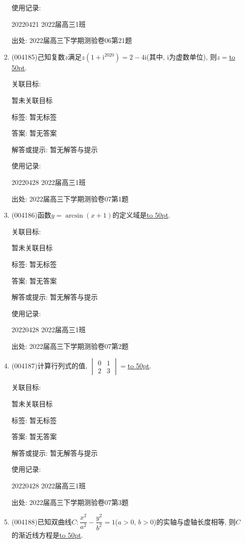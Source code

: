 \documentclass[10pt,a4paper]{article}
\newcommand{\blank}[1]{\underline{\hbox to #1pt{}}}
\begin{document}
\begin{enumerate}[1.]
使用记录:

20220421	2022届高三1班			


出处: 2022届高三下学期测验卷06第21题
\item { (004185)}己知复数$z$满足$z(1+\mathrm{i}^{2020})=2-4\mathrm{i}$(其中, $\mathrm{i}$为虚数单位), 则$z=$\blank{50}.


关联目标:

暂未关联目标



标签: 暂无标签

答案: 暂无答案

解答或提示: 暂无解答与提示

使用记录:

20220428	2022届高三1班	


出处: 2022届高三下学期测验卷07第1题
\item { (004186)}函数$y=\arcsin (x+1)$的定义域是\blank{50}.


关联目标:

暂未关联目标



标签: 暂无标签

答案: 暂无答案

解答或提示: 暂无解答与提示

使用记录:

20220428	2022届高三1班	


出处: 2022届高三下学期测验卷07第2题
\item { (004187)}计算行列式的值, $\begin{vmatrix}0 & 1  \\2 & 3  \end{vmatrix}=$\blank{50}.


关联目标:

暂未关联目标



标签: 暂无标签

答案: 暂无答案

解答或提示: 暂无解答与提示

使用记录:

20220428	2022届高三1班	


出处: 2022届高三下学期测验卷07第3题
\item { (004188)}已知双曲线$C:\dfrac{x^2}{a^2}-\dfrac{y^2}{b^2}=1$($a>0$, $b>0$)的实轴与虚轴长度相等, 则$C$的渐近线方程是\blank{50}.



\end{enumerate}
\end{document}
